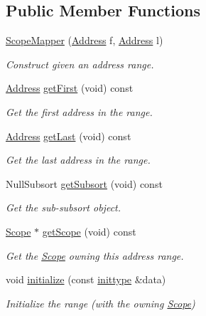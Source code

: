 \subsection*{Public Member Functions}
\begin{DoxyCompactItemize}
\item 
\mbox{\hyperlink{class_scope_mapper_a6cab25632b1b02a580131c0bff608916}{Scope\+Mapper}} (\mbox{\hyperlink{class_address}{Address}} f, \mbox{\hyperlink{class_address}{Address}} l)
\begin{DoxyCompactList}\small\item\em Construct given an address range. \end{DoxyCompactList}\item 
\mbox{\hyperlink{class_address}{Address}} \mbox{\hyperlink{class_scope_mapper_adf6664a17aad19c26b5d32509273a477}{get\+First}} (void) const
\begin{DoxyCompactList}\small\item\em Get the first address in the range. \end{DoxyCompactList}\item 
\mbox{\hyperlink{class_address}{Address}} \mbox{\hyperlink{class_scope_mapper_a7b10c3bbd5e521f353276d11f17a8eba}{get\+Last}} (void) const
\begin{DoxyCompactList}\small\item\em Get the last address in the range. \end{DoxyCompactList}\item 
Null\+Subsort \mbox{\hyperlink{class_scope_mapper_a13857db9bed82727ea59305a39f1b35a}{get\+Subsort}} (void) const
\begin{DoxyCompactList}\small\item\em Get the sub-\/subsort object. \end{DoxyCompactList}\item 
\mbox{\hyperlink{class_scope}{Scope}} $\ast$ \mbox{\hyperlink{class_scope_mapper_a23c2829e2b4151d867eb53fe54e72423}{get\+Scope}} (void) const
\begin{DoxyCompactList}\small\item\em Get the \mbox{\hyperlink{class_scope}{Scope}} owning this address range. \end{DoxyCompactList}\item 
void \mbox{\hyperlink{class_scope_mapper_a755dd2d2f55d82e07682375f3de2a54c}{initialize}} (const \mbox{\hyperlink{class_scope_mapper_a021edc02284840d933cb7a3217a292ad}{inittype}} \&data)
\begin{DoxyCompactList}\small\item\em Initialize the range (with the owning \mbox{\hyperlink{class_scope}{Scope}}) \end{DoxyCompactList}\end{DoxyCompactItemize}
